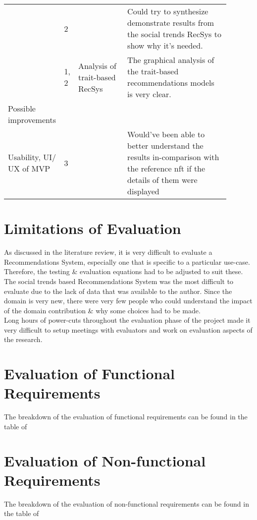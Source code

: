 \begin{longtable}{|p{0.16\linewidth}|p{0.05\linewidth}|p{0.22\linewidth}|p{0.46\linewidth}|}
\cline{2-2}\cline{4-4}
 & 2 &  & Could try to synthesize  demonstrate results from the social trends RecSys to show why it’s needed. \\* 
\cline{2-4}
 & 1, 2 & Analysis of trait-based RecSys & The graphical analysis of the trait-based recommendations models is very clear. \\ 
\hline
Possible improvements &  &  &  \\
\hline
Usability, UI/ UX of MVP & 3 &  & Would've been able to better understand the results in-comparison with the reference \gls{nft} if the details of them were displayed \\
\hline
\end{longtable}




\section{Limitations of Evaluation}
As discussed in the literature review, it is very difficult to evaluate a Recommendations System, especially one that is specific to a particular use-case. Therefore, the testing \& evaluation equations had to be adjusted to suit these.
The social trends based Recommendations System was the most difficult to evaluate due to the lack of data that was available to the author.
Since the domain is very new, there were very few people who could understand the impact of the domain contribution \& why some choices had to be made.\\
Long hours of power-cuts throughout the evaluation phase of the project made it very difficult to setup meetings with evaluators and work on evaluation aspects of the research.

\section{Evaluation of Functional Requirements}
The breakdown of the evaluation of functional requirements can be found in the table  of \textbf{}

\section{Evaluation of Non-functional Requirements}
The breakdown of the evaluation of non-functional requirements can be found in the table  of \textbf{}

